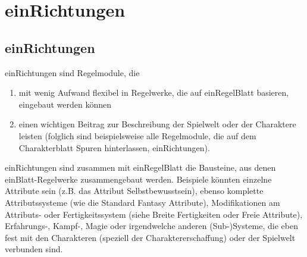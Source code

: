 \part {einRichtungen}
\chapter {einRichtungen}
einRichtungen sind Regelmodule, die
\begin{enumerate}
\item mit wenig Aufwand flexibel in Regelwerke, die auf einRegelBlatt basieren, eingebaut werden können
\item einen wichtigen Beitrag zur Beschreibung der Spielwelt oder der Charaktere leisten (folglich sind beispielsweise alle Regelmodule, die auf dem Charakterblatt Spuren hinterlassen, einRichtungen).
\end{enumerate}
einRichtungen sind zusammen mit einRegelBlatt die Bausteine, aus denen einBlatt-Regelwerke zusammengebaut werden.
Beispiele könnten einzelne Attribute sein (z.B. das Attribut Selbstbewusstsein), ebenso komplette Attributssysteme (wie die Standard Fantasy Attribute), Modifikationen am Attributs- oder Fertigkeitssystem (siehe Breite Fertigkeiten oder Freie Attribute), Erfahrungs-, Kampf-, Magie oder irgendwelche anderen (Sub-)Systeme, die eben fest mit den Charakteren (speziell der Charaktererschaffung) oder der Spielwelt verbunden sind.
